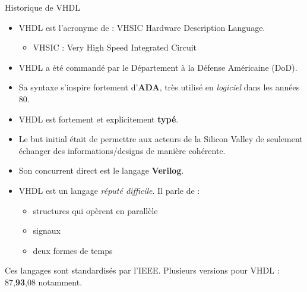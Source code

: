 \begin{frame}{Historique de VHDL}
  \begin{itemize}
    \item VHDL est l'acronyme de : VHSIC Hardware Description Language.
    \begin{itemize}
      \item VHSIC : Very High Speed Integrated Circuit
    \end{itemize}
    \item VHDL a été commandé par le Département à la Défense Américaine (DoD).
    \item Sa syntaxe s'inspire fortement d'\textbf{ADA}, très utilisé en \textit{logiciel} dans les années 80.
    \item VHDL est fortement et explicitement \textbf{typé}.
    \item Le but initial était de permettre aux acteurs de la Silicon Valley de seulement échanger des informations/designs de manière cohérente.
    \item Son concurrent direct est le langage \textbf{Verilog}.
    \item VHDL est un langage \textit{réputé difficile}. Il parle de :
    \begin{itemize}
      \item structures qui opèrent en parallèle
      \item signaux
      \item deux formes de temps
    \end{itemize}
  \end{itemize}

  Ces langages sont standardisés par l'IEEE. Plusieurs versions pour VHDL : 87,\textbf{93},08 notamment.
\end{frame}

